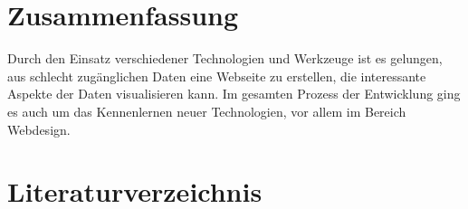 \documentclass[12pt,a4paper]{scrreprt}
\begin{document}
 
\newpage

\tableofcontents 







\chapter*{Zusammenfassung}
Durch den Einsatz verschiedener Technologien und Werkzeuge ist es gelungen, aus schlecht zugänglichen Daten eine Webseite zu erstellen, die interessante Aspekte der Daten visualisieren kann. Im gesamten Prozess der Entwicklung ging es auch um das Kennenlernen neuer Technologien, vor allem im Bereich Webdesign.

\chapter*{Literaturverzeichnis}
\printbibliography	
\end{document}
